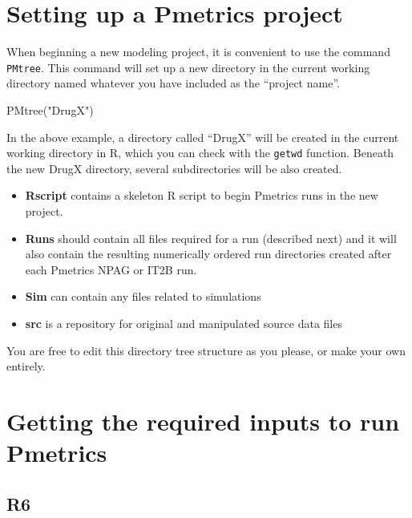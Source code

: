 \documentclass[
]{book}
\newenvironment{Shaded}{\begin{snugshade}}{\end{snugshade}}
\newcommand{\FunctionTok}[1]{\textcolor[rgb]{0.00,0.00,0.00}{#1}}
\newcommand{\NormalTok}[1]{#1}
\newcommand{\StringTok}[1]{\textcolor[rgb]{0.31,0.60,0.02}{#1}}
\providecommand{\tightlist}{%
  \setlength{\itemsep}{0pt}\setlength{\parskip}{0pt}}
\begin{document}
\hypertarget{setting-up-a-pmetrics-project}{%
\section{Setting up a Pmetrics project}\label{setting-up-a-pmetrics-project}}

When beginning a new modeling project, it is convenient to use the
command \texttt{PMtree}. This command will set up a new directory
in the current working directory named whatever you have included as the
``project name''.

\begin{Shaded}
\begin{Highlighting}[]
\FunctionTok{PMtree}\NormalTok{(}\StringTok{"DrugX"}\NormalTok{)}
\end{Highlighting}
\end{Shaded}

In the above example, a directory called ``DrugX'' will be created
in the current working directory in R, which you can check with the \texttt{getwd} function. Beneath the new DrugX directory, several subdirectories will
be also created.

\begin{itemize}
\tightlist
\item
  \textbf{Rscript} contains a skeleton R script to begin Pmetrics runs in the new project.
\item
  \textbf{Runs} should contain all files required for a run (described next) and it will also contain the resulting numerically ordered run directories created after each Pmetrics NPAG or IT2B run.
\item
  \textbf{Sim} can contain any files related to simulations
\item
  \textbf{src} is a repository for original and manipulated source data files
\end{itemize}

You are free to edit this directory tree structure as you please, or make your
own entirely.

\hypertarget{getting-the-required-inputs-to-run-pmetrics}{%
\section{Getting the required inputs to run Pmetrics}\label{getting-the-required-inputs-to-run-pmetrics}}

\hypertarget{r6}{%
\subsection{R6}\label{r6}}
\end{document}
